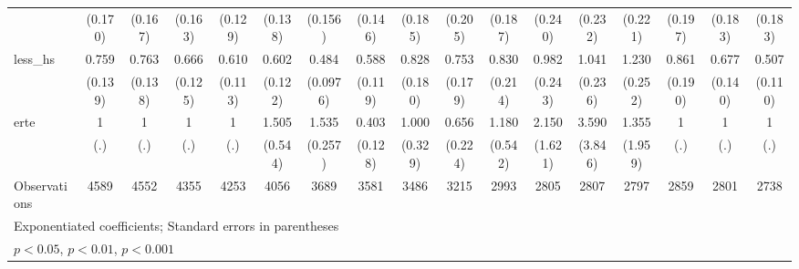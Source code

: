 {\begin{tabular}{l*{16}{c}}
                    &     (0.170)         &     (0.167)         &     (0.163)         &     (0.129)         &     (0.138)         &     (0.156)         &     (0.146)         &     (0.185)         &     (0.205)         &     (0.187)         &     (0.240)         &     (0.232)         &     (0.221)         &     (0.197)         &     (0.183)         &     (0.183)         \\
[1em]
less\_hs             &       0.759         &       0.763         &       0.666\sym{*}  &       0.610\sym{**} &       0.602\sym{*}  &       0.484\sym{***}&       0.588\sym{**} &       0.828         &       0.753         &       0.830         &       0.982         &       1.041         &       1.230         &       0.861         &       0.677         &       0.507\sym{**} \\
                    &     (0.139)         &     (0.138)         &     (0.125)         &     (0.113)         &     (0.122)         &    (0.0976)         &     (0.119)         &     (0.180)         &     (0.179)         &     (0.214)         &     (0.243)         &     (0.236)         &     (0.252)         &     (0.190)         &     (0.140)         &     (0.110)         \\
[1em]
erte                &           1         &           1         &           1         &           1         &       1.505         &       1.535\sym{*}  &       0.403\sym{**} &       1.000         &       0.656         &       1.180         &       2.150         &       3.590         &       1.355         &           1         &           1         &           1         \\
                    &         (.)         &         (.)         &         (.)         &         (.)         &     (0.544)         &     (0.257)         &     (0.128)         &     (0.329)         &     (0.224)         &     (0.542)         &     (1.621)         &     (3.846)         &     (1.959)         &         (.)         &         (.)         &         (.)         \\
\hline
Observations        &        4589         &        4552         &        4355         &        4253         &        4056         &        3689         &        3581         &        3486         &        3215         &        2993         &        2805         &        2807         &        2797         &        2859         &        2801         &        2738         \\
\hline\hline
\multicolumn{17}{l}{\footnotesize Exponentiated coefficients; Standard errors in parentheses}\\
\multicolumn{17}{l}{\footnotesize \sym{*} \(p<0.05\), \sym{**} \(p<0.01\), \sym{***} \(p<0.001\)}\\
\end{tabular}
}
